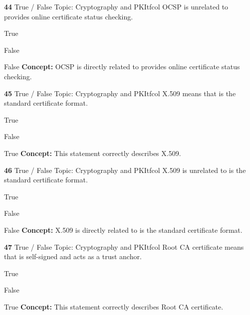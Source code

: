 \documentclass[10pt,a4paper]{article}
\begin{document}
\begin{qcard}{\color{white}\textbf{44} \hfill \small True / False \textbar{} Topic: Cryptography and PKI}{tfcol}
OCSP is unrelated to provides online certificate status checking.

\begin{qoptions}
\item True
\item False
\end{qoptions}
\begin{explainbox}{False}
\textbf{Concept:} OCSP is directly related to provides online certificate status checking.
\end{explainbox}
\end{qcard}

\begin{qcard}{\color{white}\textbf{45} \hfill \small True / False \textbar{} Topic: Cryptography and PKI}{tfcol}
X.509 means that is the standard certificate format.

\begin{qoptions}
\item True
\item False
\end{qoptions}
\begin{explainbox}{True}
\textbf{Concept:} This statement correctly describes X.509.
\end{explainbox}
\end{qcard}

\begin{qcard}{\color{white}\textbf{46} \hfill \small True / False \textbar{} Topic: Cryptography and PKI}{tfcol}
X.509 is unrelated to is the standard certificate format.

\begin{qoptions}
\item True
\item False
\end{qoptions}
\begin{explainbox}{False}
\textbf{Concept:} X.509 is directly related to is the standard certificate format.
\end{explainbox}
\end{qcard}

\begin{qcard}{\color{white}\textbf{47} \hfill \small True / False \textbar{} Topic: Cryptography and PKI}{tfcol}
Root CA certificate means that is self-signed and acts as a trust anchor.

\begin{qoptions}
\item True
\item False
\end{qoptions}
\begin{explainbox}{True}
\textbf{Concept:} This statement correctly describes Root CA certificate.
\end{explainbox}
\end{qcard}
\end{document}
